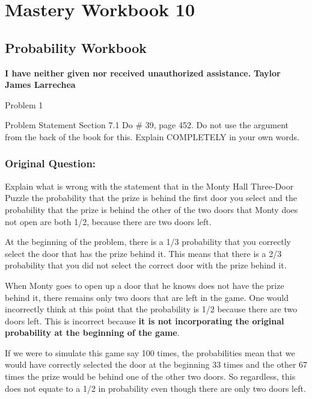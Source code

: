 \clearpage
\chapter{Mastery Workbook 10}

\section{Probability Workbook}


\begin{center}
    \Large{\textbf{I have neither given nor received unauthorized assistance.}}
    \large{\textbf{Taylor James Larrechea}}
\end{center}

\begin{problem}{Problem 1}
    \begin{statement}{Problem Statement}
        Section 7.1 Do \# 39, page 452. Do not use the argument from the back of the book for this. Explain COMPLETELY in your own words.

        \subsection*{Original Question:}

        Explain what is wrong with the statement that in the Monty Hall Three-Door Puzzle the probability that the prize is behind the first door you select and the probability that the prize is behind 
        the other of the two doors that Monty does not open are both 1/2, because there are two doors left.
    \end{statement}

    \begin{Highlight}[Solution]
        At the beginning of the problem, there is a 1/3 probability that you correctly select the door that has the prize behind it. This means that there is a 2/3 probability that you did not select the
        correct door with the prize behind it.

        When Monty goes to open up a door that he knows does not have the prize behind it, there remains only two doors that are left in the game. One would incorrectly think at this point that the probability
        is 1/2 because there are two doors left. This is incorrect because \textbf{it is not incorporating the original probability at the beginning of the game}.

        If we were to simulate this game say 100 times, the probabilities mean that we would have correctly selected the door at the beginning 33 times and the other 67 times the prize would be behind 
        one of the other two doors. So regardless, this does not equate to a 1/2 in probability even though there are only two doors left.
    \end{Highlight}
\end{problem}

